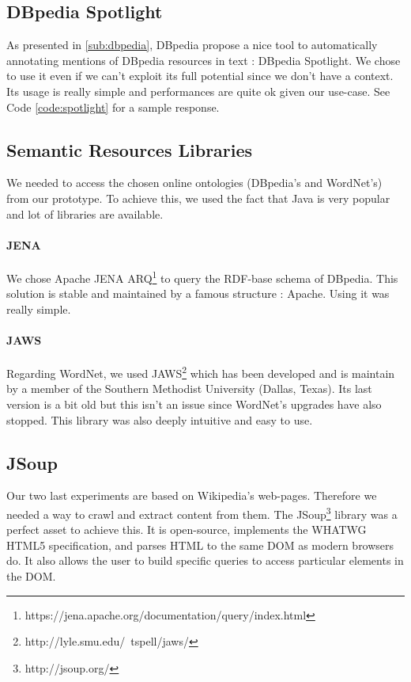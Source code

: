 \subsection{DBpedia Spotlight} %
\label{sub:dbpedia_spotlight}
As presented in \ref{sub:dbpedia}, DBpedia propose a nice tool to automatically annotating mentions of DBpedia resources in text : DBpedia Spotlight. We chose to use it even if we can't exploit its full potential since we don't have a context. Its usage is really simple and performances are quite ok given our use-case. See Code \ref{code:spotlight} for a sample response.

\subsection{Semantic Resources Libraries} %
\label{sub:semantic_resources_libraries}
We needed to access the chosen online ontologies (DBpedia's and WordNet's) from our prototype. To achieve this, we used the fact that Java is very popular and lot of libraries are available.
\paragraph{JENA} %
\label{par:jena}
We chose Apache JENA ARQ\footnote{https://jena.apache.org/documentation/query/index.html} to query the RDF-base schema of DBpedia. This solution is stable and maintained by a famous structure : Apache. Using it was really simple.
\paragraph{JAWS} %
\label{par:jaws}
Regarding WordNet, we used JAWS\footnote{http://lyle.smu.edu/~tspell/jaws/} which has been developed and is maintain by a member of the Southern Methodist University (Dallas, Texas). Its last version is a bit old but this isn't an issue since WordNet's upgrades have also stopped. This library was also deeply intuitive and easy to use.
\subsection{JSoup}
Our two last experiments are based on Wikipedia's web-pages. Therefore we needed a way to crawl and extract content from them. The JSoup\footnote{http://jsoup.org/} library was a perfect asset to achieve this. It is open-source, implements the WHATWG HTML5 specification, and parses HTML to the same DOM as modern browsers do. It also allows the user to build specific queries to access particular elements in the DOM.

